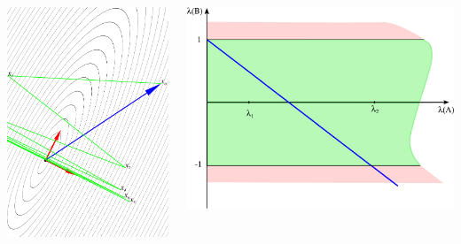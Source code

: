 \documentclass[professionalfonts,compress,unicode]{beamer}
\begin{document}
{
\begin{columns}
\begin{column}{0.5\textwidth}
\includegraphics[width=\columnwidth]{si0_51.pdf}%
\end{column}
\begin{column}{0.5\textwidth}
\includegraphics[width=\columnwidth]{lAlB0_51.pdf}%
\end{column}
\end{columns}
}
\end{document}
